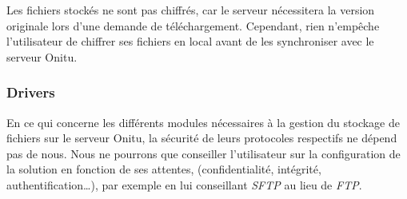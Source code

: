 Les fichiers stockés ne sont pas chiffrés, car le serveur nécessitera la version originale lors d'une demande de téléchargement. Cependant, rien n'empêche l'utilisateur de chiffrer ses fichiers en local avant de les synchroniser avec le serveur Onitu.

\subsubsection{Drivers}
En ce qui concerne les différents modules nécessaires à la gestion du stockage de fichiers sur le serveur Onitu, la sécurité de leurs protocoles respectifs ne dépend pas de nous. Nous ne pourrons que conseiller l'utilisateur sur la configuration de la solution en fonction de ses attentes, (confidentialité, intégrité, authentification…), par exemple en lui conseillant \textit{SFTP} au lieu de \textit{FTP}.

